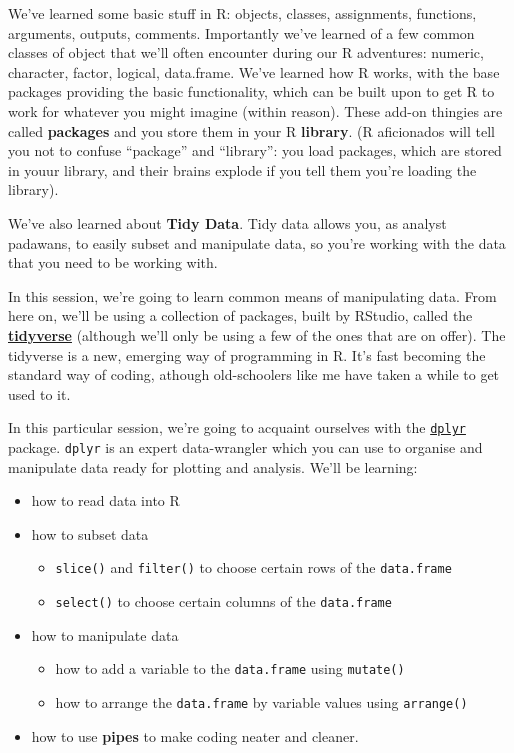 \documentclass[
]{book}
\providecommand{\tightlist}{%
  \setlength{\itemsep}{0pt}\setlength{\parskip}{0pt}}
\begin{document}
We've learned some basic stuff in R: objects, classes, assignments, functions,
arguments, outputs, comments. Importantly we've learned of a few common classes
of object that we'll often encounter during our R adventures: numeric,
character, factor, logical, data.frame. We've learned how
R works, with the base packages providing the basic functionality, which can be
built upon to get R to work for whatever you might imagine (within reason).
These add-on thingies are called \textbf{packages} and you store them in your R
\textbf{library}. (R aficionados will tell you not to confuse ``package'' and ``library'':
you load packages, which are stored in youur library, and their brains
explode if you tell them you're loading the library).

We've also learned about \textbf{Tidy Data}. Tidy data allows you, as analyst padawans,
to easily subset and manipulate data, so you're working with the data that you
need to be working with.

In this session, we're going to learn common means of manipulating data. From
here on, we'll be using a collection of packages, built by RStudio, called the
\href{https://www.tidyverse.org}{\textbf{tidyverse}} (although we'll only be using a
few of the ones that are on offer). The tidyverse is a new, emerging way of
programming in R. It's fast becoming the standard way of coding, athough
old-schoolers like me have taken a while to get used to it.

In this particular session, we're going to acquaint ourselves with the
\href{https://dplyr.tidyverse.org/}{\texttt{dplyr}} package. \texttt{dplyr} is an expert
data-wrangler which you can use to organise and manipulate data ready for
plotting and analysis. We'll be learning:

\begin{itemize}
\tightlist
\item
  how to read data into R
\item
  how to subset data

  \begin{itemize}
  \tightlist
  \item
    \texttt{slice()} and \texttt{filter()} to choose certain rows of the \texttt{data.frame}
  \item
    \texttt{select()} to choose certain columns of the \texttt{data.frame}
  \end{itemize}
\item
  how to manipulate data

  \begin{itemize}
  \tightlist
  \item
    how to add a variable to the \texttt{data.frame} using \texttt{mutate()}
  \item
    how to arrange the \texttt{data.frame} by variable values using \texttt{arrange()}
  \end{itemize}
\item
  how to use \textbf{pipes} to make coding neater and cleaner.\\
  ~\\
\end{itemize}
\end{document}
